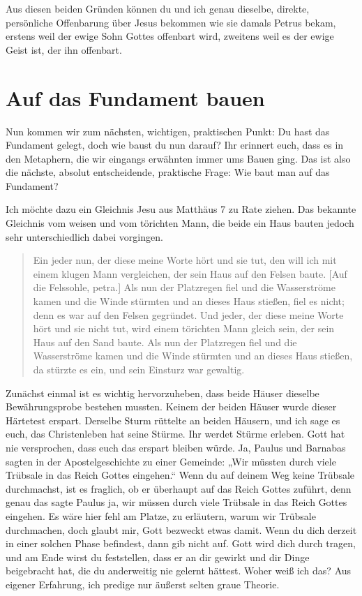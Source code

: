 Aus diesen beiden Gründen können du und ich genau dieselbe, direkte, persönliche Offenbarung über Jesus bekommen wie sie damals Petrus bekam, erstens weil der ewige Sohn Gottes offenbart wird, zweitens weil es der ewige Geist ist, der ihn offenbart.

\section{Auf das Fundament bauen}

Nun kommen wir zum nächsten, wichtigen, praktischen Punkt: Du hast das Fundament gelegt, doch wie baust du nun darauf? 
Ihr erinnert euch, dass es in den Metaphern, die wir eingangs erwähnten immer ums Bauen ging. 
Das ist also die nächste, absolut entscheidende, praktische Frage: Wie baut man auf das Fundament?

Ich möchte dazu ein Gleichnis Jesu aus Matthäus 7 zu Rate ziehen.
Das bekannte Gleichnis vom weisen und vom törichten Mann, die beide ein Haus bauten jedoch sehr unterschiedlich dabei vorgingen.

\begin{quotation}
  Ein jeder nun, der diese meine Worte hört und sie tut, den will ich mit einem klugen Mann vergleichen, der sein Haus auf den Felsen baute.
  [Auf die Felssohle, petra.]
  Als nun der Platzregen fiel und die Wasserströme kamen und die Winde stürmten und an dieses Haus stießen, fiel es nicht; denn es war auf den Felsen gegründet.
  Und jeder, der diese meine Worte hört und sie nicht tut, wird einem törichten Mann gleich sein, der sein Haus auf den Sand baute.
  Als nun der Platzregen fiel und die Wasserströme kamen und die Winde stürmten und an dieses Haus stießen, da stürzte es ein, und sein Einsturz war gewaltig.
\end{quotation}

Zunächst einmal ist es wichtig hervorzuheben, dass beide Häuser dieselbe Bewährungsprobe bestehen mussten.
Keinem der beiden Häuser wurde dieser Härtetest erspart.
Derselbe Sturm rüttelte an beiden Häusern, und ich sage es euch, das Christenleben hat seine Stürme.
Ihr werdet Stürme erleben.
Gott hat nie versprochen, dass euch das erspart bleiben würde.
Ja, Paulus und Barnabas sagten in der Apostelgeschichte zu einer Gemeinde: „Wir müssten durch viele Trübsale in das Reich Gottes eingehen.“
Wenn du auf deinem Weg keine Trübsale durchmachst, ist es fraglich, ob er überhaupt auf das Reich Gottes zuführt, denn genau das sagte Paulus ja, wir müssen durch viele Trübsale in das Reich Gottes eingehen.
Es wäre hier fehl am Platze, zu erläutern, warum wir Trübsale durchmachen, doch glaubt mir, Gott bezweckt etwas damit.
Wenn du dich derzeit in einer solchen Phase befindest, dann gib nicht auf.
Gott wird dich durch tragen, und am Ende wirst du feststellen, dass er an dir gewirkt und dir Dinge beigebracht hat, die du anderweitig nie gelernt hättest. Woher weiß ich das?
Aus eigener Erfahrung, ich predige nur äußerst selten graue Theorie.

